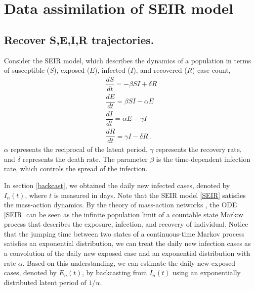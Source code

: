 \documentclass[sn-mathphys,Numbered]{sn-jnl}
\begin{document}
\section{Data assimilation of SEIR model}

\subsection{Recover S,E,I,R trajectories.}\label{recoverSEIR}

Consider the SEIR model, which describes the dynamics of a population in terms of susceptible ($S$), exposed ($E$), infected ($I$), and recovered ($R$) case count,
\begin{align}
    & \dfrac{dS}{dt} = -\beta SI+\delta R \nonumber\\
    & \dfrac{dE}{dt} = \beta SI - \alpha E \nonumber\\
    & \dfrac{dI}{dt} = \alpha E - \gamma I \nonumber\\
    & \dfrac{dR}{dt} = \gamma I - \delta R \,.\label{SEIR}
\end{align}
$\alpha$ represents the reciprocal of the latent period, $\gamma$ represents the recovery rate, and $\delta$ represents the death rate. The parameter $\beta$ is the time-dependent infection rate, which controls the spread of the infection.

In section \ref{backcast}, we obtained the daily new infected cases, denoted by $I_n(t)$, where $t$ is measured in days. Note that the SEIR model \eqref{SEIR} satisfies the mass-action dynamics. By the theory of mass-action networks \cite{anderson2011continuous,anderson2015stochastic}, the ODE \eqref{SEIR} can be seen as the infinite population limit of a countable state Markov process that describes the exposure, infection, and recovery of individual. Notice that the jumping time between two states of a continuous-time Markov process satisfies an exponential distribution, we can treat the daily new infection cases as a convolution of the daily new exposed case and an exponential distribution with rate $\alpha$. Based on this understanding, we can estimate the daily new exposed cases, denoted by $E_n(t)$, by backcasting from $I_n(t)$ using an exponentially distributed latent period of $1/\alpha$.
\end{document}
